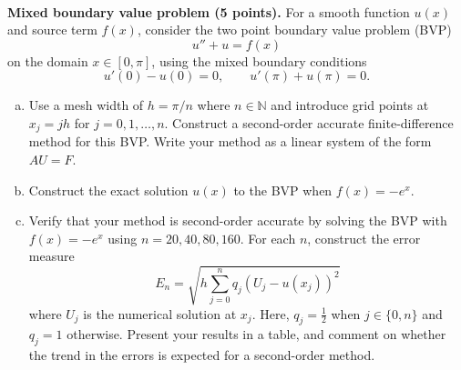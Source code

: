 \documentclass{article}
\def\N{{\mathbb N}}
\begin{document}
\begin{problem} \\ 
  \textbf{Mixed boundary value problem (5 points).}
        For a smooth function $u(x)$ and source term $f(x)$, consider the two
        point boundary value problem (BVP)
        \begin{equation}
          u''+u = f(x)
        \end{equation}
        on the domain $x\in [0,\pi]$, using the mixed boundary conditions
        \begin{equation}
          u'(0) - u(0) = 0, \qquad u'(\pi) + u(\pi) =0.
        \end{equation}
        \begin{enumerate}[a)]
          \item Use a mesh width of $h=\pi/n$ where $n\in \N$ and introduce grid
                points at $x_j=jh$ for $j=0,1,\ldots, n$. Construct a second-order
                accurate finite-difference method for this BVP. Write
                your method as a linear system of the form $AU=F$.
          \item Construct the exact solution $u(x)$ to the BVP when $f(x)=-e^x$.
          \item Verify that your method is second-order accurate by solving the BVP
                with $f(x)=-e^x$ using $n=20,40,80,160$. For each $n$, construct the
                error measure
                \begin{equation}
                  E_n = \sqrt{ h \sum_{j=0}^n q_j (U_j - u(x_j))^2 }
                \end{equation}
                where $U_j$ is the numerical solution at $x_j$. Here, $q_j = \tfrac12$
                when $j\in \{0,n\}$ and $q_j=1$ otherwise. Present your results in a
                table, and comment on whether the trend in the errors is expected for a
                second-order method.
        \end{enumerate}
\end{problem}
\end{document}
